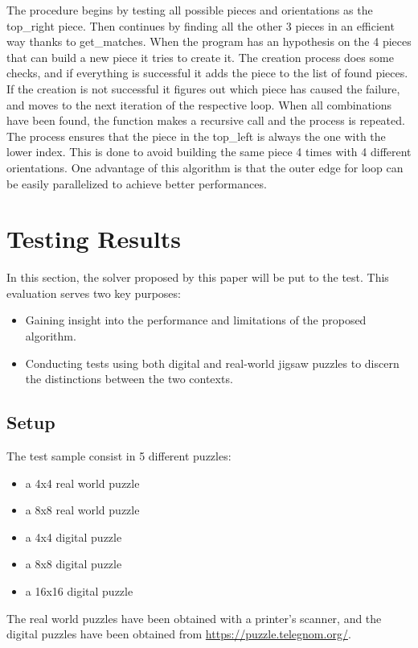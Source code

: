 \documentclass{article}
\begin{document}
The procedure begins by testing all possible pieces and orientations as the top\_right piece.
Then continues by finding all the other 3 pieces in an efficient way thanks to get\_matches.
When the program has an hypothesis on the 4 pieces that can build a new piece it tries to create it.\newline
The creation process does some checks, and if everything is successful it adds the piece to the list of found pieces.
If the creation is not successful it figures out which piece has caused the failure, and moves to the next iteration of the respective loop.\newline
When all combinations have been found, the function makes a recursive call and the process is repeated.\newline
The process ensures that the piece in the top\_left is always the one with the lower index.
This is done to avoid building the same piece 4 times with 4 different orientations.\newline
One advantage of this algorithm is that the outer edge for loop can be easily parallelized to achieve better performances.

\section{Testing Results}

In this section, the solver proposed by this paper will be put to the test.
This evaluation serves two key purposes:

\begin{itemize}
  \item Gaining insight into the performance and limitations of the proposed algorithm.
  \item Conducting tests using both digital and real-world jigsaw puzzles to discern the distinctions between the two contexts.
\end{itemize}

\subsection{Setup}
The test sample consist in 5 different puzzles:
\begin{itemize}
  \item a 4x4 real world puzzle
  \item a 8x8 real world puzzle
  \item a 4x4 digital puzzle
  \item a 8x8 digital puzzle
  \item a 16x16 digital puzzle
\end{itemize}
The real world puzzles have been obtained with a printer’s scanner,
and the digital puzzles have been obtained from \url{https://puzzle.telegnom.org/}.
\end{document}
